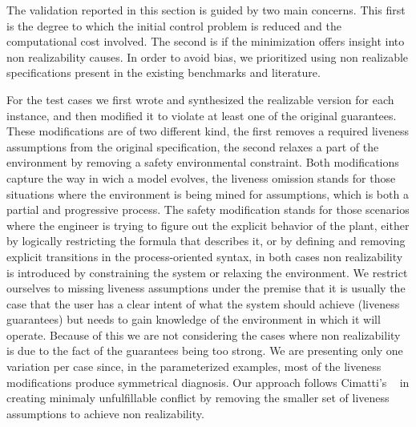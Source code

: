 The validation reported in this section is guided by two main concerns.  This first is the degree to which the initial control problem is reduced and the computational cost involved. The second is if the minimization offers insight into non realizability causes.
In order to avoid bias, we prioritized using non realizable specifications present in the existing benchmarks and literature.

For the test cases we first wrote and synthesized the realizable version for each instance, and then modified it
to violate at least one of the original guarantees. 
These modifications are of two different kind, the first removes a required liveness assumptions from the original specification, the second relaxes a part of the environment by removing a safety environmental constraint. Both modifications capture the way in wich a model evolves, the liveness omission stands for those situations where the environment is being mined for assumptions, which is both a partial and progressive process. The safety modification stands for those scenarios where the engineer is trying to figure out the explicit behavior of the plant, either by logically restricting the formula that describes it, or by defining and removing explicit transitions in the process-oriented syntax, in both cases non realizability is introduced by constraining the system or relaxing the environment. We restrict ourselves to missing liveness assumptions under the premise that it is usually the case that the user has a clear intent of what the system should achieve (liveness guarantees) but needs to gain knowledge of the environment in which it will operate.  Because of this we are not considering the cases where non realizability is due to the fact of the guarantees being too strong. We are presenting only one variation per case since, in the parameterized examples, most of the liveness modifications produce symmetrical diagnosis. Our approach follows Cimatti's ~\cite{DBLP:conf/vmcai/CimattiRST08} in creating minimaly unfulfillable conflict by removing the smaller set of liveness assumptions to achieve non realizability.
 
